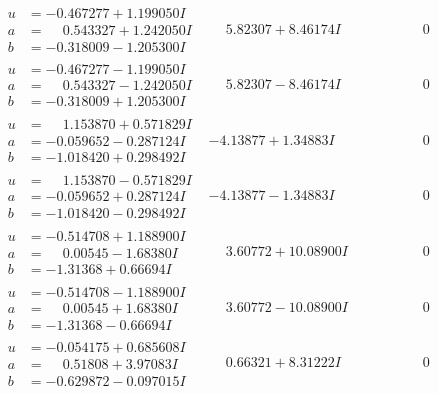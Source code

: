 \documentclass[1p]{elsarticle_modified}
\theoremstyle{definition}
\begin{document}
$$\begin{array}{c|c|c}
\begin{aligned}
u &= -0.467277 + 1.199050 I \\
a &= \phantom{-}0.543327 + 1.242050 I \\
b &= -0.318009 - 1.205300 I\end{aligned}
 & \phantom{-}5.82307 + 8.46174 I & \phantom{-0.000000 } 0 \\ \hline\begin{aligned}
u &= -0.467277 - 1.199050 I \\
a &= \phantom{-}0.543327 - 1.242050 I \\
b &= -0.318009 + 1.205300 I\end{aligned}
 & \phantom{-}5.82307 - 8.46174 I & \phantom{-0.000000 } 0 \\ \hline\begin{aligned}
u &= \phantom{-}1.153870 + 0.571829 I \\
a &= -0.059652 - 0.287124 I \\
b &= -1.018420 + 0.298492 I\end{aligned}
 & -4.13877 + 1.34883 I & \phantom{-0.000000 } 0 \\ \hline\begin{aligned}
u &= \phantom{-}1.153870 - 0.571829 I \\
a &= -0.059652 + 0.287124 I \\
b &= -1.018420 - 0.298492 I\end{aligned}
 & -4.13877 - 1.34883 I & \phantom{-0.000000 } 0 \\ \hline\begin{aligned}
u &= -0.514708 + 1.188900 I \\
a &= \phantom{-}0.00545 - 1.68380 I \\
b &= -1.31368 + 0.66694 I\end{aligned}
 & \phantom{-}3.60772 + 10.08900 I & \phantom{-0.000000 } 0 \\ \hline\begin{aligned}
u &= -0.514708 - 1.188900 I \\
a &= \phantom{-}0.00545 + 1.68380 I \\
b &= -1.31368 - 0.66694 I\end{aligned}
 & \phantom{-}3.60772 - 10.08900 I & \phantom{-0.000000 } 0 \\ \hline\begin{aligned}
u &= -0.054175 + 0.685608 I \\
a &= \phantom{-}0.51808 + 3.97083 I \\
b &= -0.629872 - 0.097015 I\end{aligned}
 & \phantom{-}0.66321 + 8.31222 I & \phantom{-0.000000 } 0 \\ \hline\begin{aligned}

\end{aligned}
\end{array}$$
\end{document}
